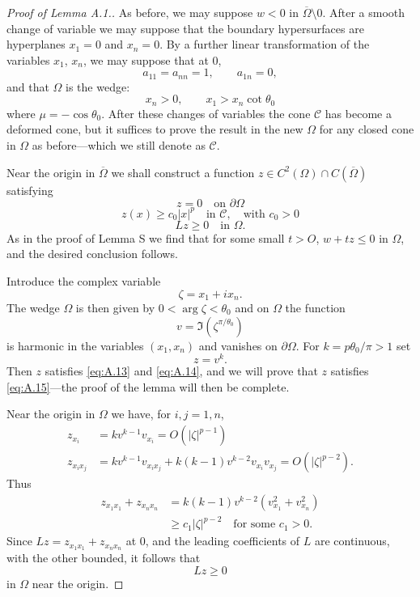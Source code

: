 \begin{proof}[Proof of Lemma A.1.]
  As before, we may suppose $w<0$ in $\overline{\Omega}\setminus 0$.
  After a smooth change of variable we may suppose that the boundary hypersurfaces
  are hyperplanes $x_1=0$ and $x_n = 0$.
  By a further linear transformation of the variables $x_1$, $x_n$,
  we may suppose that at $0$,
  \[a_{11} = a_{nn} = 1,\qquad a_{1n} = 0,\]
  and that $\Omega$ is the wedge:
  \[x_n>0,\qquad x_1 > x_n\cot\theta_0\]
  where $\mu = -\cos\theta_0$.
  After these changes of variables the cone $\mathscr{C}$ has become a deformed cone,
  but it suffices to prove the result in the new $\Omega$ for any closed cone in 
  $\Omega$ as before---which we still denote as $\mathscr{C}$.

  Near the origin in $\overline{\Omega}$ we shall construct a function
  $z\in C^2(\Omega)\cap C(\overline{\Omega})$ satisfying
  \begin{equation}\label{eq:A.13}
    z = 0\quad\text{on } \partial\Omega
  \end{equation}
  \begin{equation}\label{eq:A.14}
    z(x) \geq c_0|x|^p\quad\text{in } \mathscr{C},\quad\text{with } c_0>0
  \end{equation}
  \begin{equation}\label{eq:A.15}
    Lz \geq 0\quad \text{in } \Omega.
  \end{equation}
  As in the proof of Lemma S we find that for some small $t>O$, $w+tz\leq 0$ in $\Omega$,
  and the desired conclusion follows.

  Introduce the complex variable
  \[\zeta = x_1 + ix_n.\]
  The wedge $\Omega$ is then given by $0< \arg \zeta < \theta_0$
  and on $\Omega$ the function
  \[v = \Im(\zeta^{\pi/\theta_0})\]
  is harmonic in the variables $(x_1, x_n)$ and vanishes on $\partial\Omega$.
  For $k = p\theta_0/\pi > 1$ set 
  \[z = v^k.\]
  Then $z$ satisfies \eqref{eq:A.13} and \eqref{eq:A.14},
  and we will prove that $z$ satisfies \eqref{eq:A.15}---the proof of the lemma
  will then be complete.

  Near the origin in $\Omega$ we have, for $i,j=1,n$,
  \begin{align*}
    z_{x_i} & = kv^{k-1}v_{x_i} = O(|\zeta|^{p-1}) \\
    z_{x_ix_j} & = kv^{k-1}v_{x_ix_j} + k(k-1)v^{k-2} v_{x_i}v_{x_j}
      = O(|\zeta|^{p-2}).
  \end{align*}
  Thus
  \begin{align*}
    z_{x_1x_1} + z_{x_nx_n}
    & = k(k-1)v^{k-2} (v_{x_1}^2 + v_{x_n}^2) \\
    & \geq c_1|\zeta|^{p-2}\quad \text{for some } c_1>0.
  \end{align*}
  Since $Lz = z_{x_1x_1} + z_{x_nx_n}$ at $0$, and the leading coefficients of $L$
  are continuous, with the other bounded, it follows that
  \[Lz\geq 0\]
  in $\Omega$ near the origin.
\end{proof}